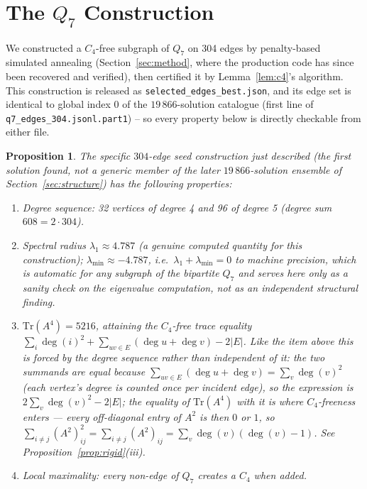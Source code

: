 \documentclass[12pt,a4paper]{article}
\newtheorem{proposition}[theorem]{Proposition}
\theoremstyle{definition}
\begin{document}
\section{The \texorpdfstring{$Q_7$}{Q7} Construction}\label{sec:q7}

We constructed a $C_4$-free subgraph of $Q_7$ on 304 edges by
penalty-based simulated annealing (Section~\ref{sec:method}, where the
production code has since been recovered and verified),
then certified it by Lemma~\ref{lem:c4}'s algorithm. This construction
is released as \texttt{selected\_edges\_best.json}, and its edge set is
identical to global index $0$ of the $19\,866$-solution catalogue
(first line of \texttt{q7\_edges\_304.jsonl.part1}) --
so every property below is directly checkable from either file.

\begin{proposition}\label{prop:q7}
The specific $304$-edge seed construction just described (the first
solution found, not a generic member of the later $19\,866$-solution
ensemble of Section~\ref{sec:structure}) has the following properties:
\begin{enumerate}[label=(\roman*)]
  \item Degree sequence: 32 vertices of degree 4 and 96 of degree 5
    (degree sum $608=2\cdot304$).
  \item Spectral radius $\lambda_1\approx4.787$ (a genuine computed
    quantity for this construction); $\lambda_{\min}\approx-4.787$, i.e.\
    $\lambda_1+\lambda_{\min}=0$ to machine precision, which is automatic
    for any subgraph of the bipartite $Q_7$ and serves here only as a
    sanity check on the eigenvalue computation, not as an independent
    structural finding.
  \item $\mathrm{Tr}(A^4)=5216$, attaining the $C_4$-free trace equality
    $\sum_i\deg(i)^2+\sum_{uv\in E}(\deg u+\deg v)-2|E|$. Like the item above
    this is forced by the degree sequence rather than independent of it: the
    two summands are equal because
    $\sum_{uv\in E}(\deg u+\deg v)=\sum_v\deg(v)^2$ (each vertex's degree
    is counted once per incident edge), so the expression is
    $2\sum_v\deg(v)^2-2|E|$; the \emph{equality} of $\mathrm{Tr}(A^4)$
    with it is where $C_4$-freeness enters --- every off-diagonal entry of
    $A^2$ is then $0$ or $1$, so
    $\sum_{i\ne j}(A^2)_{ij}^2=\sum_{i\ne j}(A^2)_{ij}
    =\sum_v\deg(v)(\deg(v)-1)$. See
    Proposition~\ref{prop:rigid}(iii).
  \item Local maximality: every non-edge of $Q_7$ creates a $C_4$ when added.
\end{enumerate}
\end{proposition}
\end{document}
